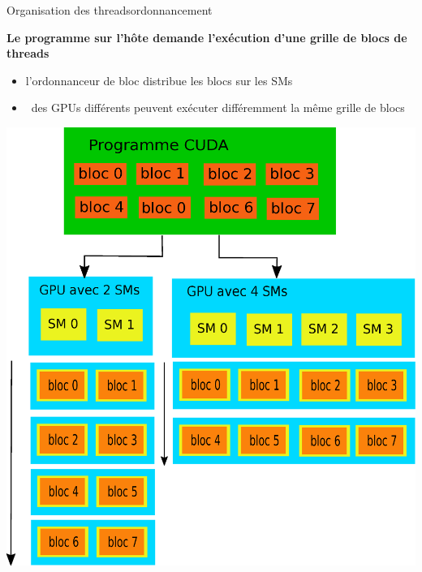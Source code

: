 \documentclass[11pt,mathserif]{beamer}
\newcommand{\kontuz}{\faExclamationTriangle\ }
\begin{document}
\begin{frame}{Organisation des threads}{ordonnancement}
 \pause
 \begin{minipage}[c]{0.59\linewidth}
   {\bf Le programme sur l'hôte demande l'exécution d'une grille de blocs de threads}
  \begin{itemize}[<+->]
    \item l'ordonnanceur de bloc distribue les blocs sur les SMs
    \item \kontuz des GPUs différents peuvent exécuter différemment la même grille de blocs
  \end{itemize}
\end{minipage}
\begin{minipage}[c]{0.39\linewidth}
\begin{center}
  \includegraphics[width=0.95\linewidth]{fig/bloc_ordonanceur.eps}
\end{center}
\end{minipage}
\end{frame}
\end{document}

